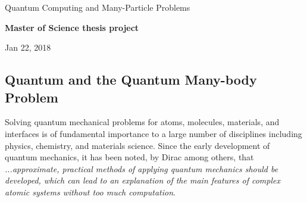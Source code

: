 \documentclass[%
oneside,                 %
final,                   %
10pt]{article}
\begin{document}

\newcommand{\exercisesection}[1]{\subsection*{#1}}






\thispagestyle{empty}

\begin{center}
{\LARGE\bf
\begin{spacing}{1.25}
Quantum Computing and Many-Particle Problems
\end{spacing}
}
\end{center}


\begin{center}
{\bf Master of Science thesis project${}^{}$} \\ [0mm]
\end{center}

\begin{center}
\end{center}
    

\begin{center}
Jan 22, 2018
\end{center}

\vspace{1cm}


\subsection*{Quantum and the Quantum Many-body Problem}

Solving quantum mechanical problems for atoms,  molecules, materials, and
interfaces is of fundamental importance to a large number of
disciplines including physics, chemistry, and materials science. Since
the early development of quantum mechanics, it has been noted, by
Dirac among others, that \emph{...approximate, practical methods of applying quantum mechanics should be developed, which can lead to an explanation of the main features of complex atomic systems without too much computation}. 
\end{document}
